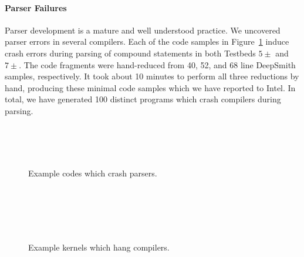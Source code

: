 
\paragraph{Parser Failures} %
Parser development is a mature and well understood practice. We uncovered parser errors in several compilers. Each of the code samples in Figure~\ref{lst:parser-crashes} induce crash errors during parsing of compound statements in both Testbeds $5\pm$ and $7\pm$. The code fragments were hand-reduced from 40, 52, and 68 line DeepSmith samples, respectively. It took about 10 minutes to perform all three reductions by hand, producing these minimal code samples which we have reported to Intel. In total, we have generated 100 distinct programs which crash compilers during parsing.

\begin{figure}
  \centering %
  \\%
  \\%
  \\%
  \caption{Example codes which crash parsers.}%
  \label{lst:parser-crashes}%
\end{figure}

\begin{figure}
  \centering %
  \\%
  \\%
  \\%
  \\%
  \caption{Example kernels which hang compilers.}%
  \label{lst:compiler-hangs}%
\end{figure}

